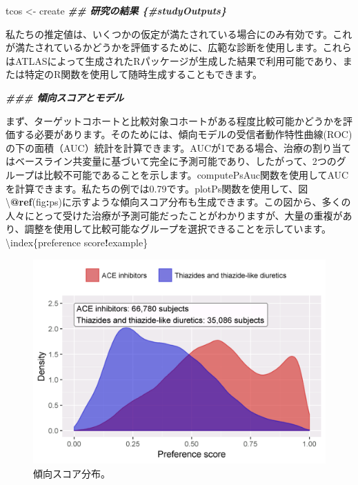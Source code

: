 \documentclass[
  11pt]{book}
\newenvironment{Shaded}{\begin{snugshade}}{\end{snugshade}}
\newcommand{\AttributeTok}[1]{\textcolor[rgb]{0.13,0.29,0.53}{#1}}
\newcommand{\DecValTok}[1]{\textcolor[rgb]{0.00,0.00,0.81}{#1}}
\newcommand{\DocumentationTok}[1]{\textcolor[rgb]{0.56,0.35,0.01}{\textbf{\textit{#1}}}}
\newcommand{\FloatTok}[1]{\textcolor[rgb]{0.00,0.00,0.81}{#1}}
\newcommand{\FunctionTok}[1]{\textcolor[rgb]{0.13,0.29,0.53}{\textbf{#1}}}
\newcommand{\NormalTok}[1]{#1}
\newcommand{\OtherTok}[1]{\textcolor[rgb]{0.56,0.35,0.01}{#1}}
\newcommand{\SpecialCharTok}[1]{\textcolor[rgb]{0.81,0.36,0.00}{\textbf{#1}}}
\newcommand{\StringTok}[1]{\textcolor[rgb]{0.31,0.60,0.02}{#1}}
\theoremstyle{definition}
\theoremstyle{definition}
\theoremstyle{definition}
\theoremstyle{definition}
\theoremstyle{remark}
\begin{document}
\begin{Shaded}
\begin{Highlighting}[]
\NormalTok{tcos }\OtherTok{\textless{}{-}}\NormalTok{ create}
\DocumentationTok{\#\# 研究の結果 \{\#studyOutputs\}}

\NormalTok{私たちの推定値は、いくつかの仮定が満たされている場合にのみ有効です。これが満たされているかどうかを評価するために、広範な診断を使用します。これらはATLASによって生成されたRパッケージが生成した結果で利用可能であり、または特定のR関数を使用して随時生成することもできます。}

\DocumentationTok{\#\#\# 傾向スコアとモデル}

\NormalTok{まず、ターゲットコホートと比較対象コホートがある程度比較可能かどうかを評価する必要があります。そのためには、傾向モデルの受信者動作特性曲線(ROC)の下の面積（AUC）統計を計算できます。AUCが1である場合、治療の割り当てはベースライン共変量に基づいて完全に予測可能であり、したがって、}\DecValTok{2}\NormalTok{つのグループは比較不可能であることを示します。}\StringTok{\textasciigrave{}}\AttributeTok{computePsAuc}\StringTok{\textasciigrave{}}\NormalTok{関数を使用してAUCを計算できます。私たちの例では0}\FloatTok{.79}\NormalTok{です。}\StringTok{\textasciigrave{}}\AttributeTok{plotPs}\StringTok{\textasciigrave{}}\NormalTok{関数を使用して、図\textbackslash{}}\SpecialCharTok{@}\FunctionTok{ref}\NormalTok{(fig}\SpecialCharTok{:}\NormalTok{ps)に示すような傾向スコア分布も生成できます。この図から、多くの人々にとって受けた治療が予測可能だったことがわかりますが、大量の重複があり、調整を使用して比較可能なグループを選択できることを示しています。 \textbackslash{}index\{preference score}\SpecialCharTok{!}\NormalTok{example\}}
\end{Highlighting}
\end{Shaded}

\begin{figure}

{\centering \includegraphics[width=0.8\linewidth]{images/PopulationLevelEstimation/ps} 

}

\caption{傾向スコア分布。}\label{fig:ps}
\end{figure}
\end{document}

